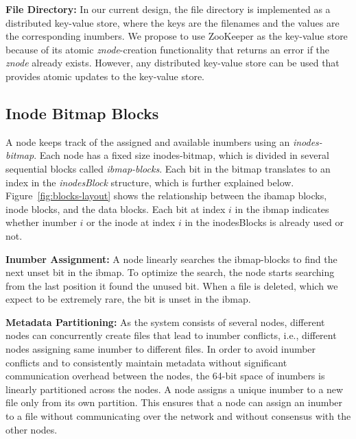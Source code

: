 \documentclass[]{article}
\newcommand{\subtopic}[1]{\vspace{1.5pt} \noindent \textbf{#1}}
\begin{document}
\subtopic{File Directory:}
In our current design, the file directory is implemented as a distributed
key-value store, where the keys are the filenames and the values are the corresponding
inumbers. We propose to use ZooKeeper as the key-value store because of its
atomic \textit{znode}-creation functionality that returns an error if
the \textit{znode} already exists. However, any distributed key-value store can be used 
that provides atomic updates to the key-value store.


\subsection{Inode Bitmap Blocks}
A node keeps track of the assigned and available inumbers using an \textit{inodes-bitmap}.
Each node has a fixed size inodes-bitmap, which is divided in several sequential blocks
called \textit{ibmap-blocks}. Each bit in the bitmap translates to an index in the
\textit{inodesBlock} structure, which is further explained below.
Figure~\ref{fig:blocks-layout} shows the relationship between the ibamap blocks, 
inode blocks, and the data blocks. Each bit at index $i$ in the
ibmap indicates whether inumber $i$ or the inode at index $i$ in the inodesBlocks
is already used or not.

\subtopic{Inumber Assignment:}
A node linearly searches the ibmap-blocks to find the next unset bit in the ibmap.
To optimize the search, the node starts searching from the last position it
found the unused bit. When a file is deleted, which we expect to be extremely
rare, the bit is unset in the ibmap.



\subtopic{Metadata Partitioning:} As the system consists of several nodes,
different nodes can concurrently create files that lead to inumber conflicts,
i.e., different nodes assigning same inumber to different files.  In order to
avoid inumber conflicts and to  consistently maintain metadata without
significant communication overhead between the nodes, the 64-bit space of
inumbers is linearly partitioned across the nodes. A node assigns a unique
inumber to a new file only from its own partition. This ensures that a node can
assign an inumber to a file without communicating over the network and without
consensus with the other nodes.
\end{document}
